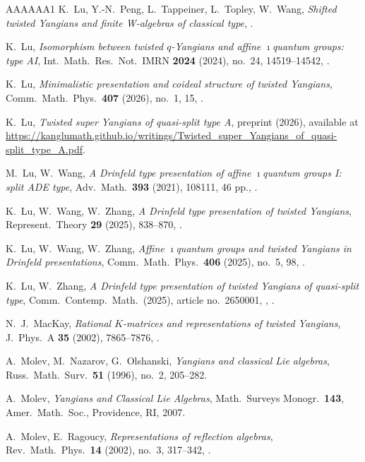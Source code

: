 \documentclass{amsart}
\numberwithin{equation}{section}
\theoremstyle{remark}
\renewcommand{\,}{\kern 0.1em} %
\begin{document}
\begin{thebibliography}{AAAAAA1}
	K.~Lu, Y.-N.~Peng, L.~Tappeiner, L.~Topley, W.~Wang,
	{\it Shifted twisted Yangians and finite W-algebras of classical type},
	.

	K.~Lu,
	{\it Isomorphism between twisted $q$-Yangians and affine $\imath$quantum groups: type AI},
	Int.~Math.~Res.~Not.~IMRN {\bf 2024} (2024), no.~24, 14519--14542,
	.

	K.~Lu,
	{\it Minimalistic presentation and coideal structure of twisted Yangians},
	Comm.~Math.~Phys.~{\bf 407} (2026), no.~1, 15,
	.

	K.~Lu,
	{\it Twisted super Yangians of quasi-split type A},
	preprint (2026), available at \url{https://kanglumath.github.io/writings/Twisted_super_Yangians_of_quasi-split_type_A.pdf}.

	M.~Lu, W.~Wang,
	{\it A Drinfeld type presentation of affine $\imath$quantum groups I: split ADE type},
	Adv.~Math.~{\bf 393} (2021), 108111, 46 pp.,
	.

	K.~Lu, W.~Wang, W.~Zhang,
	{\it A Drinfeld type presentation of twisted Yangians},
	Represent.~Theory {\bf 29} (2025), 838--870,
	.

	K.~Lu, W.~Wang, W.~Zhang,
	{\it Affine $\imath$quantum groups and twisted Yangians in Drinfeld presentations},
	Comm.~Math.~Phys.~{\bf 406} (2025), no.~5, 98,
	.

	K.~Lu, W.~Zhang,
	{\it A Drinfeld type presentation of twisted Yangians of quasi-split type},
	Comm.~Contemp.~Math.~(2025), article no.~2650001,
	,
	.

	N.~J.~MacKay,
	{\it Rational $K$-matrices and representations of twisted Yangians},
	J.~Phys.~A {\bf 35} (2002), 7865--7876,
	.

	A.~Molev, M.~Nazarov, G.~Olshanski,
	{\it Yangians and classical Lie algebras},
	Russ.~Math.~Surv.~{\bf 51} (1996), no.~2, 205--282.

	A.~Molev,
	{\it Yangians and Classical Lie Algebras},
	Math.~Surveys Monogr.~{\bf 143}, Amer.~Math.~Soc., Providence, RI, 2007.

	A.~Molev, E.~Ragoucy,
	{\it Representations of reflection algebras},
	Rev.~Math.~Phys.~{\bf 14} (2002), no.~3, 317--342,
	.


\end{thebibliography}
\end{document}
